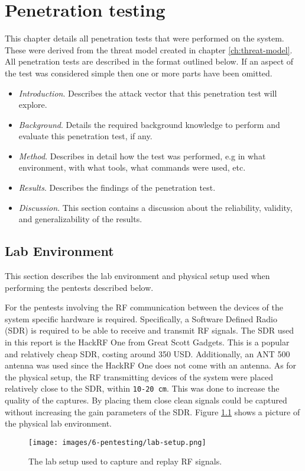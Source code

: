 \chapter{Penetration testing} \label{ch:pentesting}
This chapter details all penetration tests that were performed on the system. These were derived from the threat model created in chapter \ref{ch:threat-model}. All penetration tests are described in the format outlined below. If an aspect of the test was considered simple then one or more parts have been omitted.
\begin{itemize}
    \item \textit{Introduction}. Describes the attack vector that this penetration test will explore.
    \item \textit{Background}. Details the required background knowledge to perform and evaluate this penetration test, if any.
    \item \textit{Method}. Describes in detail how the test was performed, e.g in what environment, with what tools, what commands were used, etc.
    \item \textit{Results}. Describes the findings of the penetration test.
    \item \textit{Discussion}. This section contains a discussion about the reliability, validity, and generalizability of the results.
\end{itemize}

\section{Lab Environment} \label{ch:pentesting:lab-setup}
This section describes the lab environment and physical setup used when performing the pentests described below.

For the pentests involving the RF communication between the devices of the system specific hardware is required. Specifically, a Software Defined Radio (SDR) is required to be able to receive and transmit RF signals. The SDR used in this report is the HackRF One from Great Scott Gadgets. This is a popular and relatively cheap SDR, costing around 350 USD. Additionally, an ANT 500 antenna was used since the HackRF One does not come with an antenna. As for the physical setup, the RF transmitting devices of the system were placed relatively close to the SDR, within \texttt{10-20 cm}. This was done to increase the quality of the captures. By placing them close clean signals could be captured without increasing the gain parameters of the SDR. Figure \ref{fig:rf-lab-setup} shows a picture of the physical lab environment.
\begin{figure}[!ht]
    \centering
    \texttt{[image: images/6-pentesting/lab-setup.png]}
    \caption{The lab setup used to capture and replay RF signals.}
    \label{fig:rf-lab-setup}
\end{figure}







